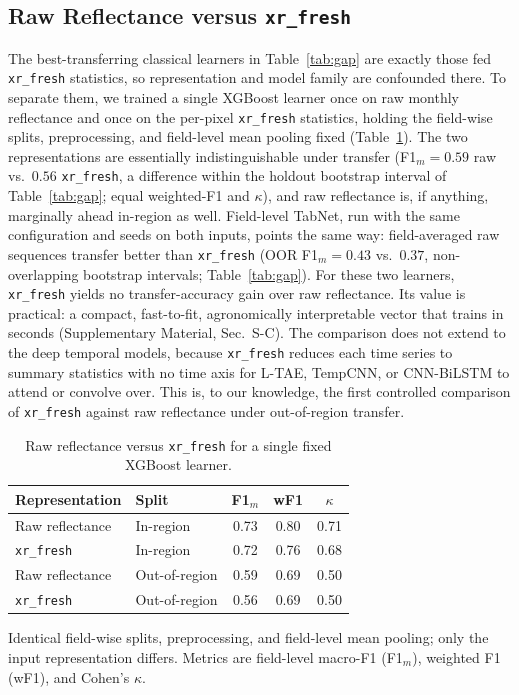 \documentclass[preprint,authoryear]{elsarticle}
\begin{document}
\subsection{Raw Reflectance versus \texttt{xr\_fresh}}
\label{sec:repr}
The best-transferring classical learners in Table~\ref{tab:gap} are exactly those fed \texttt{xr\_fresh} statistics, so representation and model family are confounded there. To separate them, we trained a single XGBoost learner once on raw monthly reflectance and once on the per-pixel \texttt{xr\_fresh} statistics, holding the field-wise splits, preprocessing, and field-level mean pooling fixed (Table~\ref{tab:repr}). The two representations are essentially indistinguishable under transfer (F1$_m=0.59$ raw vs.\ $0.56$ \texttt{xr\_fresh}, a difference within the holdout bootstrap interval of Table~\ref{tab:gap}; equal weighted-F1 and $\kappa$), and raw reflectance is, if anything, marginally ahead in-region as well. Field-level TabNet, run with the same configuration and seeds on both inputs, points the same way: field-averaged raw sequences transfer better than \texttt{xr\_fresh} (OOR F1$_m=0.43$ vs.\ $0.37$, non-overlapping bootstrap intervals; Table~\ref{tab:gap}). For these two learners, \texttt{xr\_fresh} yields no transfer-accuracy gain over raw reflectance. Its value is practical: a compact, fast-to-fit, agronomically interpretable vector that trains in seconds (Supplementary Material, Sec.~S-C). The comparison does not extend to the deep temporal models, because \texttt{xr\_fresh} reduces each time series to summary statistics with no time axis for L-TAE, TempCNN, or CNN-BiLSTM to attend or convolve over. This is, to our knowledge, the first controlled comparison of \texttt{xr\_fresh} against raw reflectance under out-of-region transfer.

\begin{table}[!t]
\centering
\caption{Raw reflectance versus \texttt{xr\_fresh} for a single fixed XGBoost learner.}
\label{tab:repr}
\renewcommand{\arraystretch}{1.1}
\setlength{\tabcolsep}{6pt}
\footnotesize
\begin{tabular}{llccc}
\toprule
\textbf{Representation} & \textbf{Split} & \textbf{F1$_m$} & \textbf{wF1} & \textbf{$\kappa$} \\
\midrule
Raw reflectance    & In-region        & 0.73 & 0.80 & 0.71 \\
\texttt{xr\_fresh} & In-region        & 0.72 & 0.76 & 0.68 \\
\midrule
Raw reflectance    & Out-of-region & 0.59 & 0.69 & 0.50 \\
\texttt{xr\_fresh} & Out-of-region & 0.56 & 0.69 & 0.50 \\
\bottomrule
\end{tabular}
\par\vspace{3pt}
\begin{minipage}{\linewidth}
\footnotesize
Identical field-wise splits, preprocessing, and field-level mean pooling; only the input representation differs. Metrics are field-level macro-F1 (F1$_m$), weighted F1 (wF1), and Cohen's $\kappa$.
\end{minipage}
\end{table}
\end{document}
